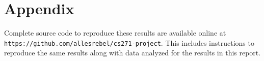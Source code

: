 \documentclass[11pt]{article}
\begin{document}
	\section{Appendix}
	Complete source code to reproduce these results are available online at\\
	 \texttt{https://github.com/allesrebel/cs271-project}\cite{allesrebel_cs271project}.
	This includes instructions to reproduce the same results along with data analyzed for the results in this report.
	
	
	
	
\end{document}
